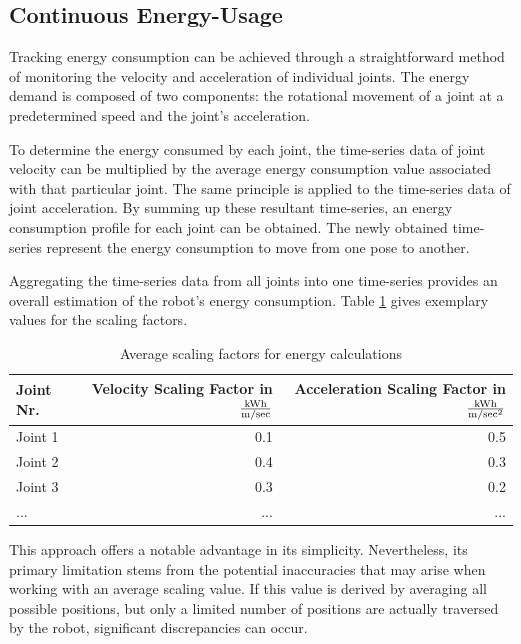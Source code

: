 \subsection{Continuous Energy-Usage}
Tracking energy consumption can be achieved through a straightforward method of monitoring the velocity and acceleration of individual joints. The energy demand is composed of two components: the rotational movement of a joint at a predetermined speed and the joint's acceleration.

To determine the energy consumed by each joint, the time-series data of joint velocity can be multiplied by the average energy consumption value associated with that particular joint. The same principle is applied to the time-series data of joint acceleration. By summing up these resultant time-series, an energy consumption profile for each joint can be obtained. The newly obtained time-series represent the energy consumption to move from one pose to another.

Aggregating the time-series data from all joints into one time-series provides an overall estimation of the robot's energy consumption. Table \ref{scalers} gives exemplary values for the scaling factors.\newline


\begin{table}[H]
	\centering
	\begin{tabular}{||l|r|r||}
		Joint Nr.  & Velocity Scaling Factor in \(\frac{\si[per-mode=symbol]{\kWh}}{\si[per-mode=symbol]{\m\per\sec }}\)& Acceleration Scaling Factor in \(\frac{\si[per-mode=symbol]{\kWh}}{\si[per-mode=symbol]{\m\per\sec\squared }}\) \\
		\hline
		\hline
		\hline
		Joint 1	& 0.1 & 0.5\\
		Joint 2	&  0.4& 0.3 \\
		Joint 3	& 0.3& 0.2\\
		...& ...& ...\\
		
		\hline
		\hline
	\end{tabular}
	
	\caption{Average scaling factors for energy calculations}
	\label{scalers}
\end{table}


This approach offers a notable advantage in its simplicity. Nevertheless, its primary limitation stems from the potential inaccuracies that may arise when working with an average scaling value. If this value is derived by averaging all possible positions, but only a limited number of positions are actually traversed by the robot, significant discrepancies can occur.


